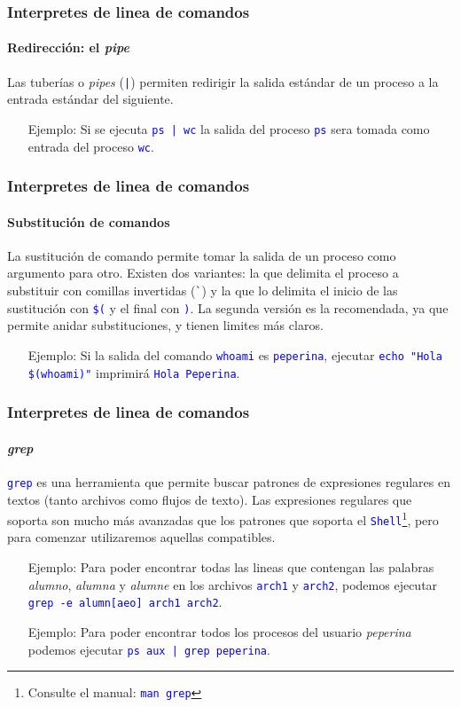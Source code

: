 \documentclass[11pt,a4paper,spanish]{beamer}
\newcommand{\cw}[1]{\mbox{\texttt{\textcolor{blue}{#1}}}}
\newcommand{\dq}[0]{\Verb+"+}
\begin{document}
\begin{frame}

    \frametitle{Interpretes de linea de comandos}
    \framesubtitle{Redirección: el \emph{pipe}}

    Las tuberías o \emph{pipes} (\cw{|}) permiten redirigir la salida
    estándar de un proceso a la entrada estándar del siguiente.

    \begin{itemize}
        \item[Ejemplo:] Si se ejecuta \cw{ps | wc} la salida del proceso
            \cw{ps} sera tomada como entrada del proceso \cw{wc}.
    \end{itemize}

\end{frame}

\begin{frame}

    \frametitle{Interpretes de linea de comandos}
    \framesubtitle{Substitución de comandos}

    La sustitución de comando permite tomar la salida de un proceso como
    argumento para otro. Existen dos variantes: la que delimita el proceso a
    substituir con comillas invertidas (\cw{\`{}}) y la que lo delimita
    el inicio de las sustitución con \cw{\$(} y el final con
    \cw{)}. La segunda versión es la recomendada, ya que permite
    anidar substituciones, y tienen limites más claros.

    \begin{itemize}
        \item[Ejemplo:] Si la salida del comando \cw{whoami} es
            \cw{peperina}, ejecutar \cw{echo \dq{}Hola
            \$(whoami)\dq{}} imprimirá \cw{Hola Peperina}.
    \end{itemize}

\end{frame}

\begin{frame}

    \frametitle{Interpretes de linea de comandos}
    \framesubtitle{\emph{grep}}

    \cw{grep} es una herramienta que permite buscar patrones de
    expresiones regulares en textos (tanto archivos como flujos de texto).
    Las expresiones regulares que soporta son mucho más avanzadas que los
    patrones que soporta el \cw{Shell}\footnote{Consulte el manual:
    \cw{man grep}}, pero para comenzar utilizaremos aquellas
    compatibles.

    \begin{itemize}
        \item[Ejemplo:] Para poder encontrar todas las lineas que contengan
            las palabras \emph{alumno}, \emph{alumna} y \emph{alumne} en los
            archivos \cw{arch1} y \cw{arch2}, podemos ejecutar
            \cw{grep -e alumn[aeo] arch1 arch2}.
        \item[Ejemplo:] Para poder encontrar todos los procesos del usuario
            \emph{peperina} podemos ejecutar \cw{ps aux | grep peperina}.
    \end{itemize}

\end{frame}
\end{document}
